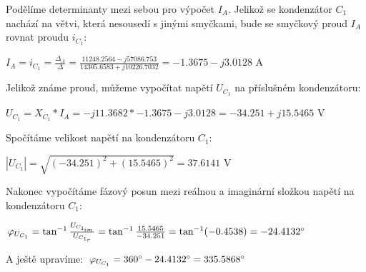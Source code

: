 \documentclass[12pt]{article}
\begin{document}
\begin{center}
Podělíme determinanty mezi sebou pro výpočet $I_A$. Jelikož se kondenzátor $C_1$ nachází na větvi, která nesousedí s jinými smyčkami, bude se smyčkový proud $I_A$ rovnat proudu $i_{C_1}$:\\
\vspace{15px}

\Large
$I_A=i_{C_1}=\frac{\Delta_A}{\Delta}=\frac{11248.2564-j57086.753}{14305.6583+j10226.7032}=-1.3675-j3.0128$ A
\vspace{15px}

\normalsize
Jelikož známe proud, můžeme vypočítat napětí $U_{C_1}$ na příslušném kondenzátoru:
\vspace{15px}

\large
$U_{C_1}=X_{C_1}*I_A=-j11.3682*-1.3675-j3.0128=-34.251+j15.5465$ V
\vspace{15px}

\normalsize
Spočítáme velikost napětí na kondenzátoru $C_1$:
\vspace{15px}

\large
$|U_{C_1}|=\sqrt{(-34.251)^2+(15.5465)^2}=37.6141$ V\\
\vspace{15px}

\normalsize
Nakonec vypočítáme fázový posun mezi reálnou a imaginární složkou napětí na kondenzátoru $C_1$:
\vspace{15px}

\Large
$\varphi_{U_{C_1}}=\tan^{-1}\frac{U_{C_{1_{im}}}}{U_{C_{1_r}}}=\tan^{-1}\frac{15.5465}{-34.251}=\tan^{-1} (-0.4538)=-24.4132\degree$\\
\vspace{15px}

\normalsize
A ještě upravíme: \large$\varphi_{U_{C_1}}=360\degree-24.4132\degree=335.5868\degree$



\end{center}
\clearpage

\end{document}
